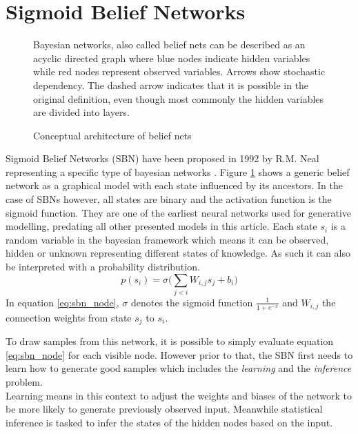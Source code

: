 \section{Sigmoid Belief Networks}
\label{sec:sbn}
\begin{figure}[htb]
\centering

  \caption{Conceptual architecture of belief nets}
  \label{fig:sbn_arch}
  \medskip
  \small
  Bayesian networks, also called belief nets can be described as an acyclic directed graph where blue nodes indicate hidden variables while red nodes represent observed variables.
  Arrows show stochastic dependency. The dashed arrow indicates that it is possible in the original definition, even though most commonly the hidden variables are divided into layers.
\end{figure}

Sigmoid Belief Networks (SBN) have been proposed in 1992 by R.M. Neal \cite{neal:1992} representing a specific type of bayesian networks \cite{pearl:1985}.
Figure \ref{fig:sbn_arch} shows a generic belief network as a graphical model with each state influenced by its ancestors.
In the case of SBNs however, all states are binary and the activation function is the sigmoid function. They are one of the earliest neural networks used for generative modelling, predating all other presented models in this article.
Each state $s_i$ is a random variable in the bayesian framework which means it can be observed, hidden or unknown representing different states of knowledge. As such it can also be interpreted with a probability distribution.
\begin{equation}
  \label{eq:sbn_node}
p(s_i) = \sigma\bigg(\sum_{j<i}W_{i,j}s_j+b_i\bigg)
\end{equation}
In equation \ref{eq:sbn_node}, $\sigma$ denotes the sigmoid function $\frac{1}{1 + e^{-x}}$ and $W_{i,j}$ the connection weights from state $s_j$ to $s_i$.

To draw samples from this network, it is possible to simply evaluate equation \ref{eq:sbn_node} for each visible node.
However prior to that, the SBN first needs to learn how to generate good samples which includes the \emph{learning} and the \emph{inference} problem.\\
Learning means in this context to adjust the weights and biases of the network to be more likely to generate previously observed input.
Meanwhile statistical inference is tasked to infer the states of the hidden nodes based on the input.\\

